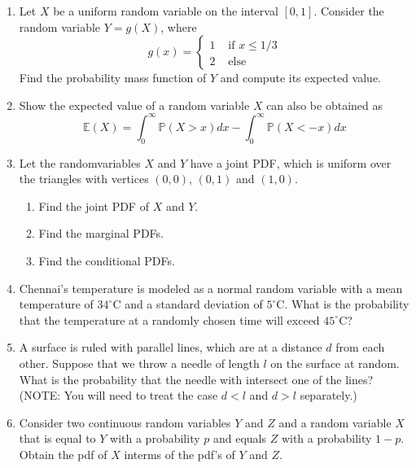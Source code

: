 \documentclass{article}
\newcommand{\dint}{\displaystyle\int}
\newcommand{\Pb}{\mathbb{P}}
\newcommand{\Eb}{\mathbb{E}}
\newcommand{\bkt}[1]{\left(#1\right)}
\begin{document}
\begin{enumerate}
		\item
		Let $X$ be a uniform random variable on the interval $[0,1]$. Consider the random variable $Y=g\bkt{X}$, where
		$$g(x) = \begin{cases}
		1 & \text{ if }x \leq 1/3\\
		2 & \text{ else}
		\end{cases}$$
		Find the probability mass function of $Y$ and compute its expected value.
		\item
		Show the expected value of a random variable $X$ can also be obtained as
		$$\Eb\bkt{X} = \dint_0^{\infty} \Pb \bkt{X > x}dx - \dint_0^{\infty} \Pb\bkt{X < -x}dx$$
		\item
		Let the randomvariables $X$ and $Y$ have a joint PDF, which is uniform over the triangles with vertices $(0,0)$, $(0,1)$ and $(1,0)$.
		\begin{enumerate}
			\item
			Find the joint PDF of $X$ and $Y$.
			\item
			Find the marginal PDFs.
			\item
			Find the conditional PDFs.
		\end{enumerate}
		\item
		Chennai's temperature is modeled as a normal random variable with a mean temperature of $34^{\circ}$C and a standard deviation of $5^{\circ}$C. What is the probability that the temperature at a randomly chosen time will exceed $45^{\circ}$C?
		\item
		A surface is ruled with parallel lines, which are at a distance $d$ from each other. Suppose that we throw a needle of length $l$ on the surface at random. What is the probability that the needle with intersect one of the lines? (NOTE: You will need to treat the case $d<l$ and $d>l$ separately.)
		\item
		Consider two continuous random variables $Y$ and $Z$ and a random variable $X$ that is equal to $Y$ with a probability $p$ and equals $Z$ with a probability $1-p$. Obtain the pdf of $X$ interms of the pdf's of $Y$ and $Z$.
	\end{enumerate}
\end{document}
